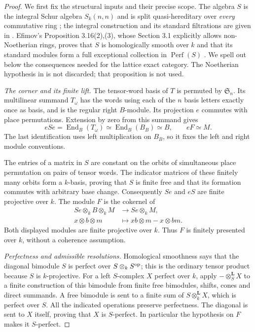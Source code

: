 \begin{proof}
We first fix the structural inputs and their precise scope.
The algebra $S$ is the integral Schur algebra $S_k(n,n)$ and is
split quasi-hereditary over \emph{every} commutative ring
\cite[Theorem 4.8]{C-EfimovSchur}; the integral construction and
its standard filtrations are given in
\cite[Theorems 8.4.11 and 8.6.6]{C-KrauseSchur}.
Efimov's Proposition 3.16(2),(3), whose Section 3.1 explicitly
allows non-Noetherian rings, proves that $S$ is homologically
smooth over $k$ and that its standard modules form a full
exceptional collection in $\operatorname{Perf}(S)$
\cite{C-EfimovSchur}.
We spell out below the consequences needed for the lattice
exact category.  The Noetherian hypothesis in
\cite[Proposition 8.6.8]{C-KrauseSchur} is not discarded;
that proposition is not used.

\emph{The corner and its finite lift.}
The tensor-word basis of $T$ is permuted by $\mathfrak S_n$.
Its multilinear summand $T_\omega$ has the words using each
of the $n$ basis letters exactly once as basis, and is the
regular right $B$-module.  Its projection $e$ commutes with
place permutations.  Extension by zero from this summand gives
\[
 eSe=\operatorname{End}_B(T_\omega)
       \simeq\operatorname{End}_B(B_B)\simeq B,\qquad eF\simeq M.
                                                               \tag{C.1.RC2}
\]
The last identification uses left multiplication on $B_B$,
so it fixes the left and right module conventions.

The entries of a matrix in $S$ are constant on the orbits of
simultaneous place permutation on pairs of tensor words.
The indicator matrices of these finitely many orbits form a
$k$-basis, proving that $S$ is finite free and that its formation
commutes with arbitrary base change.
Consequently $Se$ and $eS$ are finite projective over $k$.
The module $F$ is the cokernel of
\[
 \begin{split}
 Se\otimes_k B\otimes_k M&\longrightarrow Se\otimes_k M,\\
 x\otimes b\otimes m&\longmapsto xb\otimes m-x\otimes bm.
 \end{split}                                                   \tag{C.1.RC3}
\]
Both displayed modules are finite projective over $k$.
Thus $F$ is finitely presented over $k$, without a coherence
assumption.

\emph{Perfectness and admissible resolutions.}
Homological smoothness says that the diagonal bimodule $S$ is
perfect over $S\otimes_k S^{\rm op}$; this is the ordinary tensor
product because $S$ is $k$-projective.
For a left $S$-complex $X$ perfect over $k$, apply
$-\otimes_S^{\mathbf L}X$ to a finite construction of this
bimodule from finite free bimodules, shifts, cones and direct
summands.  A free bimodule is sent to a finite sum of
$S\otimes_k^{\mathbf L}X$, which is perfect over $S$.
All the indicated operations preserve perfectness.
The diagonal is sent to $X$ itself, proving that $X$ is
$S$-perfect.  In particular the hypothesis on $F$ makes it
$S$-perfect.


\end{proof}
